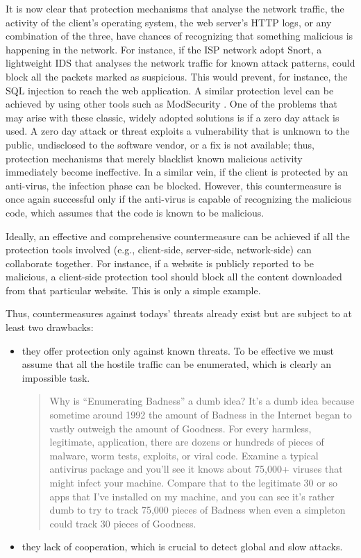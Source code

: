 \documentclass[12pt]{article}
\theoremstyle{definition}
\begin{document}
		It is now clear that protection mechanisms that analyse the network
		traffic, the activity of the client's operating system, the web
		server's HTTP logs, or any combination of the three, have chances
		of recognizing that something malicious is happening in the
		network\cite{Gupta2016}. For instance, if the ISP network adopt \textsf{Snort}, a
		lightweight IDS that analyses the network traffic for known
		attack patterns, could block all the packets marked as
		suspicious. This would prevent, for instance, the SQL injection
		to reach the web application. A similar protection level can be
		achieved by using other tools such as \textsf{ModSecurity}
		. One of the problems that may arise with
		these classic, widely adopted solutions is if a zero day
		attack is used. A zero day attack or threat exploits a vulnerability
		that is unknown to the public, undisclosed to the software vendor, or
		a fix is not available; thus, protection mechanisms that merely
		blacklist known malicious activity immediately become ineffective. In
		a similar vein, if the client is protected by an anti-virus, the
		infection phase can be blocked. However, this countermeasure is once
		again successful only if the anti-virus is capable of recognizing the
		malicious code, which assumes that the code is known to be malicious.
		
		Ideally, an effective and comprehensive countermeasure can be achieved
		if all the protection tools involved (e.g., client-side,
		server-side, network-side) can collaborate together\cite{Bosman2017}. For
		instance, if a website is publicly reported to be malicious, a
		client-side protection tool should block all the content
		downloaded from that particular website. This is only a simple
		example.
		
		Thus, countermeasures against todays' threats already exist but are
		subject to at least two drawbacks:
		
		\begin{itemize}
			\item they offer protection only against known threats. To be
			effective we must assume that all the hostile traffic can be
			enumerated, which is clearly an impossible task.
			
			\begin{quotation}
				Why is ``Enumerating Badness'' a dumb idea? It's a dumb idea
				because sometime around 1992 the amount of Badness in the Internet
				began to vastly outweigh the amount of Goodness. For every
				harmless, legitimate, application, there are dozens or hundreds of
				pieces of malware, worm tests, exploits, or viral code. Examine a
				typical antivirus package and you'll see it knows about 75,000+
				viruses that might infect your machine. Compare that to the
				legitimate 30 or so apps that I've installed on my machine, and
				you can see it's rather dumb to try to track 75,000 pieces of
				Badness when even a simpleton could track 30 pieces of
				Goodness.
			\end{quotation}
			
			\item they lack of cooperation, which is crucial to detect global and
			slow attacks.
		\end{itemize}
		
\end{document}
